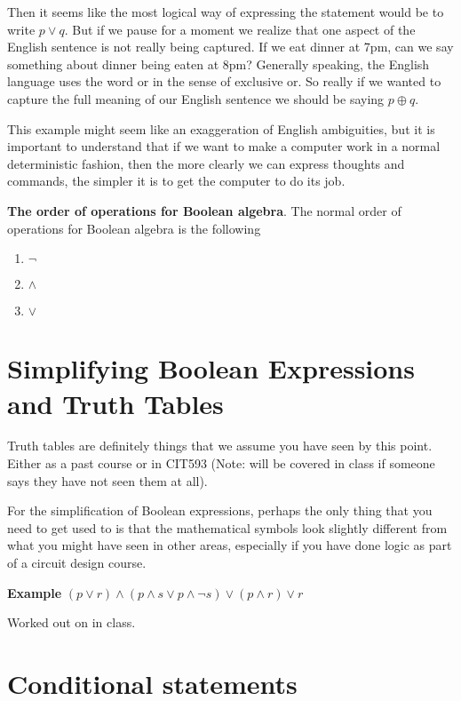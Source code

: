 \documentclass[12pt]{article}
\begin{document}
Then it seems like the most logical way of expressing the statement would be to write $p \vee q$. But if we pause for a moment we realize that one aspect of the English sentence is not really being captured. If we eat dinner at 7pm, can we say something about dinner being eaten at 8pm? Generally speaking, the English language uses the word or in the sense of exclusive or. So really if we wanted to capture the full meaning of our English sentence we should be saying $p \oplus q$.

This example might seem like an exaggeration of English ambiguities, but it is important to understand that if we want to make a computer work in a normal deterministic fashion, then the more clearly we can express thoughts and commands, the simpler it is to get the computer to do its job. 

\textbf{The order of operations for Boolean algebra}. The normal order of operations for Boolean algebra is the following

\begin{enumerate}
\item $\neg$
\item $\wedge$
\item $\vee$
\end{enumerate}

\section*{Simplifying Boolean Expressions and Truth Tables}

Truth tables are definitely things that we assume you have seen by this point. Either as a past course or in CIT593 (Note: will be covered in class if someone says they have not seen them at all).

For the simplification of Boolean expressions, perhaps the only thing that you need to get used to is that the mathematical symbols look slightly different from what you might have seen in other areas, especially if you have done logic as part of a circuit design course.

\medskip

\textbf{Example}
$(p \vee r) \wedge (p \wedge s \vee p \wedge \neg s) \vee (p \wedge r) \vee r$

Worked out on in class.

\section*{Conditional statements}
\end{document}
